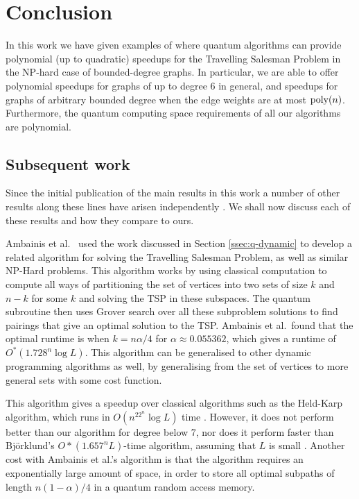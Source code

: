 \section{Conclusion}
\label{sec:tsp-conclusion}

In this work we have given examples of where quantum algorithms can provide polynomial (up to quadratic) speedups for the Travelling Salesman Problem in the NP-hard case of bounded-degree graphs. In particular, we are able to offer polynomial speedups for graphs of up to degree 6 in general, and speedups for graphs of arbitrary bounded degree when the edge weights are at most $\operatorname{poly}(n)$. Furthermore, the quantum computing space requirements of all our algorithms are polynomial.

\subsection{Subsequent work}

Since the initial publication of the main results in this work a number of other results along these lines have arisen independently \cite{ambainis2018, ronagh2019, ge2019}. We shall now discuss each of these results and how they compare to ours.

Ambainis et al.~\cite{ambainis2018} used the work discussed in Section \ref{ssec:q-dynamic} to develop a related algorithm for solving the Travelling Salesman Problem, as well as similar NP-Hard problems. This algorithm works by using classical computation to compute all ways of partitioning the set of vertices into two sets of size $k$ and $n-k$ for some $k$ and solving the TSP in these subspaces. The quantum subroutine then uses Grover search over all these subproblem solutions to find pairings that give an optimal solution to the TSP. Ambainis et al.\ found that the optimal runtime is when $k=n\alpha/4$ for $\alpha\approx0.055362$, which gives a runtime of $O^*(1.728^n\log L)$. This algorithm can be generalised to other dynamic programming algorithms as well, by generalising from the set of vertices to more general sets with some cost function.

This algorithm gives a speedup over classical algorithms such as the Held-Karp algorithm, which runs in $O(n^22^n\log L)$ time \cite{held1962}. However, it does not perform better than our algorithm for degree below 7, nor does it perform faster than Bj\"orklund's $O*(1.657^nL)$-time algorithm, assuming that $L$ is small \cite{bjorklund14}. Another cost with Ambainis et al.'s algorithm is that the algorithm requires an exponentially large amount of space, in order to store all optimal subpaths of length $n(1-\alpha)/4$ in a quantum random access memory.

